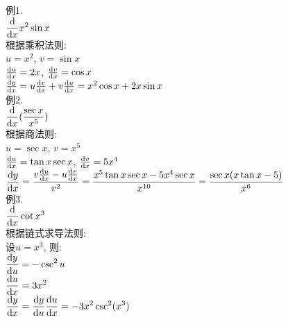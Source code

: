 例1.\\
\phantom{例}$\displaystyle\frac{\dif}{\dif x}x^2\sin x$\\
根据乘积法则:\\
$u=x^2$, $v=\sin x$\\
$\frac{\dif u}{\dif x}=2x$, $\frac{\dif v}{\dif x}=\cos x$\\
$\frac{\dif y}{\dif x}=u\frac{\dif v}{\dif x}+v\frac{\dif u}{\dif x}=x^2\cos x+2x\sin x$\\[2ex]

例2.\\
\phantom{例}$\displaystyle\frac{\dif}{\dif x}(\frac{\sec x}{x^5})$\\
根据商法则:\\
$u=\sec x$, $v=x^5$\\
$\frac{\dif u}{\dif x}=\tan x\sec x$, $\frac{\dif v}{\dif x}=5x^4$\\
$\displaystyle\frac{\dif y}{\dif x}=\frac{v\frac{\dif u}{\dif x}-u\frac{\dif v}{\dif x}}{v^2}=\frac{x^5\tan x\sec x-5x^4\sec x}{x^{10}}=\frac{\sec x(x\tan x-5)}{x^6}$\\[2ex]

例3.\\
\phantom{例}$\displaystyle\frac{\dif}{\dif x}\cot x^3$\\
根据链式求导法则:\\
设$u=x^3$, 则:\\
$\displaystyle\frac{\dif y}{\dif u}=-\csc^2u$\\
$\displaystyle\frac{\dif u}{\dif x}=3x^2$\\
$\displaystyle\frac{\dif y}{\dif x}=\frac{\dif y}{\dif u}\frac{\dif u}{\dif x}=-3x^2\csc^2(x^3)$

